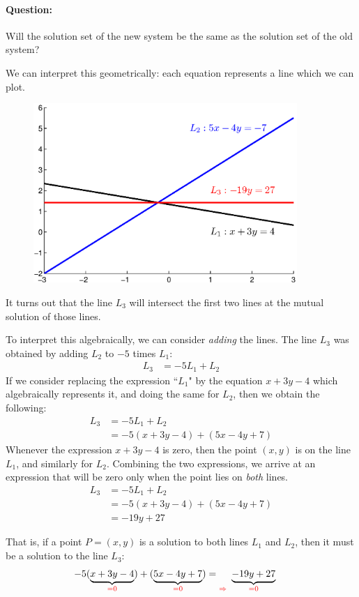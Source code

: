 \documentclass[11pt]{article}
\newcommand{\ques}{\paragraph{Question:}}
\begin{document}
\ques Will the solution set of the new system be the same as the solution set of the old system?

We can interpret this geometrically: each equation represents a line which we can plot.
\begin{figure}[H]
\centering
\includegraphics[width=10cm]{rowop3_visual.eps}
\end{figure}
It turns out that the line $L_3$ will intersect the first two lines at the mutual solution of those lines.

To interpret this algebraically, we can consider \emph{adding} the lines. The line $L_3$ was obtained by adding $L_2$ to $-5$ times $L_1$:
\begin{align*}
L_3 &= -5 L_1 + L_2
\end{align*}
If we consider replacing the expression ``$L_1$" by the equation $x+3y-4$ which algebraically represents it, and doing the same for $L_2$, then we obtain the following:
\begin{align*}
L_3 &= -5 L_1 + L_2
\\
&= -5(x+3y-4) + (5x-4y+7)
\end{align*}
Whenever the expression $x+3y-4$ is zero, then the point $(x,y)$ is on the line $L_1$, and similarly for $L_2$. Combining the two expressions, we arrive at an expression that will be zero only when the point lies on \emph{both} lines.
\begin{align*}
L_3 &= -5 L_1 + L_2
\\
&= -5(x+3y-4) + (5x-4y+7)
\\
&= -19y + 27
\end{align*}

That is, if a point $P = (x,y)$ is a solution to both lines $L_1$ and $L_2$, then it must be a solution to the line $L_3$:
\begin{align*}
-5(\underbrace{x+3y-4}_{\textcolor{red}{=0}}) + (\underbrace{5x-4y+7}_{\textcolor{red}{=0}})
=
\underbrace{-19y + 27}_{\textcolor{red}{\Rightarrow \hspace{.8cm} =0 \hspace{.8cm}\hphantom{\Rightarrow}}}
\end{align*}
\end{document}
